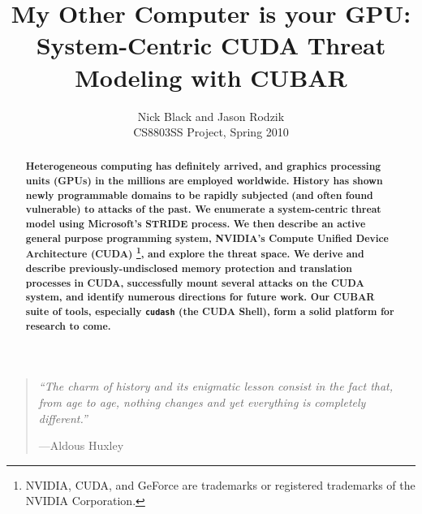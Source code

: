 \documentclass[letterpaper,10pt]{article}
\title{My Other Computer is your GPU:\\
System-Centric CUDA Threat Modeling with CUBAR}
\author{Nick Black and Jason Rodzik\\
CS8803SS Project, Spring 2010}
\date{}
\begin{document}
\maketitle

\begin{quotation}\scriptsize\textit{``The charm of history and its enigmatic lesson consist in the fact that, from age to age, nothing changes and yet everything is completely different.''}

\hfill---Aldous Huxley \end{quotation}

\begin{abstract}
\textbf{Heterogeneous computing has definitely arrived, and graphics processing
units (GPUs) in the millions are employed worldwide. History has shown newly
programmable domains to be rapidly subjected (and often found vulnerable) to
attacks of the past. We enumerate a system-centric threat model using Microsoft's
STRIDE process\cite{stride}. We then describe an active general purpose
programming system, NVIDIA's Compute Unified Device Architecture
(CUDA) \footnote{NVIDIA, CUDA, and GeForce are trademarks or registered trademarks of the NVIDIA Corporation.},
and explore the threat space. We derive
and describe previously-undisclosed memory protection and translation processes
in CUDA, successfully mount several attacks on the CUDA system, and identify
numerous directions for future work. Our CUBAR suite of tools, especially \texttt{cudash}
(the CUDA Shell), form a solid platform for research to come.}

\end{abstract}
\end{document}
